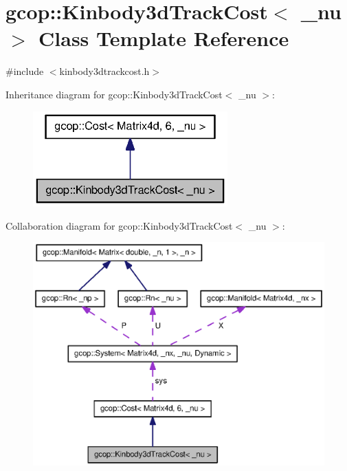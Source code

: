 \section{gcop\-:\-:\-Kinbody3d\-Track\-Cost$<$ \-\_\-nu $>$ \-Class \-Template \-Reference}
\label{classgcop_1_1Kinbody3dTrackCost}


{\ttfamily \#include $<$kinbody3dtrackcost.\-h$>$}



\-Inheritance diagram for gcop\-:\-:\-Kinbody3d\-Track\-Cost$<$ \-\_\-nu $>$\-:
\nopagebreak
\begin{figure}[H]
\begin{center}
\leavevmode
\includegraphics[width=212pt]{classgcop_1_1Kinbody3dTrackCost__inherit__graph}
\end{center}
\end{figure}


\-Collaboration diagram for gcop\-:\-:\-Kinbody3d\-Track\-Cost$<$ \-\_\-nu $>$\-:
\nopagebreak
\begin{figure}[H]
\begin{center}
\leavevmode
\includegraphics[width=350pt]{classgcop_1_1Kinbody3dTrackCost__coll__graph}
\end{center}
\end{figure}
